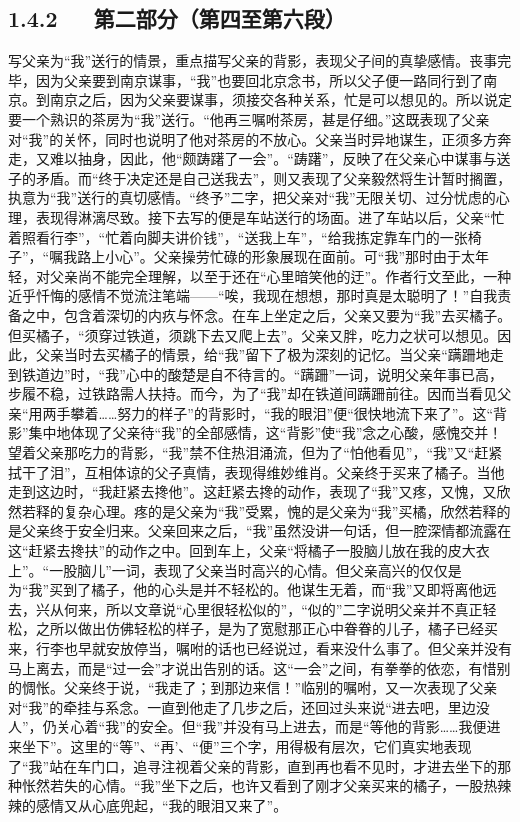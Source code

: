 \documentclass[letterpaper,12pt,english]{sphinxmanual}
\begin{document}
\subsection{1.4.2   第二部分（第四至第六段）}
\label{\detokenize{p01_u6563_u6587/_u6731_u81ea_u6e05-_u80cc_u5f71:id8}}
写父亲为“我”送行的情景，重点描写父亲的背影，表现父子间的真挚感情。丧事完毕，因为父亲要到南京谋事，“我”也要回北京念书，所以父子便一路同行到了南京。到南京之后，因为父亲要谋事，须接交各种关系，忙是可以想见的。所以说定要一个熟识的茶房为“我”送行。“他再三嘱咐茶房，甚是仔细。”这既表现了父亲对“我”的关怀，同时也说明了他对茶房的不放心。父亲当时异地谋生，正须多方奔走，又难以抽身，因此，他“颇踌躇了一会”。“踌躇”，反映了在父亲心中谋事与送子的矛盾。而“终于决定还是自己送我去”，则又表现了父亲毅然将生计暂时搁置，执意为“我”送行的真切感情。“终予”二字，把父亲对“我”无限关切、过分忧虑的心理，表现得淋漓尽致。接下去写的便是车站送行的场面。进了车站以后，父亲“忙着照看行李”，“忙着向脚夫讲价钱”，“送我上车”，“给我拣定靠车门的一张椅子”，“嘱我路上小心”。父亲操劳忙碌的形象展现在面前。可“我”那时由于太年轻，对父亲尚不能完全理解，以至于还在“心里暗笑他的迂”。作者行文至此，一种近乎忏悔的感情不觉流注笔端——“唉，我现在想想，那时真是太聪明了！”自我责备之中，包含着深切的内疚与怀念。在车上坐定之后，父亲又要为“我”去买橘子。但买橘子，“须穿过铁道，须跳下去又爬上去”。父亲又胖，吃力之状可以想见。因此，父亲当时去买橘子的情景，给“我”留下了极为深刻的记忆。当父亲“蹒跚地走到铁道边”时，“我”心中的酸楚是自不待言的。“蹒跚”一词，说明父亲年事已高，步履不稳，过铁路需人扶持。而今，为了“我”却在铁道间蹒跚前往。因而当看见父亲“用两手攀着……努力的样子”的背影时，“我的眼泪”便“很快地流下来了”。这“背影”集中地体现了父亲待“我”的全部感情，这“背影”使“我”念之心酸，感愧交并！望着父亲那吃力的背影，“我”禁不住热泪涌流，但为了“怕他看见”，“我”又“赶紧拭干了泪”，互相体谅的父子真情，表现得维妙维肖。父亲终于买来了橘子。当他走到这边时，“我赶紧去搀他”。这赶紧去搀的动作，表现了“我”又疼，又愧，又欣然若释的复杂心理。疼的是父亲为“我”受累，愧的是父亲为“我”买橘，欣然若释的是父亲终于安全归来。父亲回来之后，“我”虽然没讲一句话，但一腔深情都流露在这“赶紧去搀扶”的动作之中。回到车上，父亲“将橘子一股脑儿放在我的皮大衣上”。“一股脑儿”一词，表现了父亲当时高兴的心情。但父亲高兴的仅仅是为“我”买到了橘子，他的心头是并不轻松的。他谋生无着，而“我”又即将离他远去，兴从何来，所以文章说“心里很轻松似的”，“似的”二字说明父亲并不真正轻松，之所以做出仿佛轻松的样子，是为了宽慰那正心中眷眷的儿子，橘子已经买来，行李也早就安放停当，嘱咐的话也已经说过，看来没什么事了。但父亲并没有马上离去，而是“过一会”才说出告别的话。这“一会”之间，有拳拳的依恋，有惜别的惆怅。父亲终于说，“我走了；到那边来信！”临别的嘱咐，又一次表现了父亲对“我”的牵挂与系念。一直到他走了几步之后，还回过头来说“进去吧，里边没人”，仍关心着“我”的安全。但“我”并没有马上进去，而是“等他的背影……我便进来坐下”。这里的“等”、“再’、“便”三个字，用得极有层次，它们真实地表现了“我”站在车门口，追寻注视着父亲的背影，直到再也看不见时，才进去坐下的那种怅然若失的心情。“我”坐下之后，也许又看到了刚才父亲买来的橘子，一股热辣辣的感情又从心底兜起，“我的眼泪又来了”。
\end{document}
